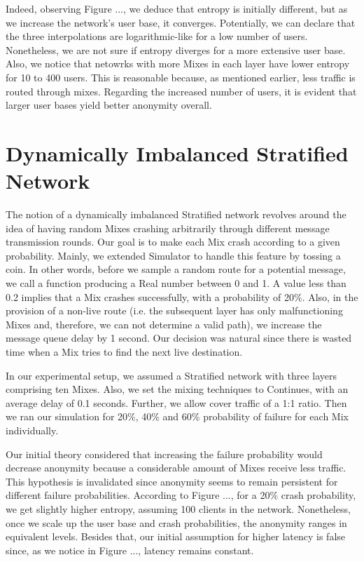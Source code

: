 \documentclass[logo,msc,cyber]{infthesis}   %
\begin{document}
Indeed, observing Figure ..., we deduce that entropy is initially different, but
as we increase the network's user base, it converges. Potentially, we can
declare that the three interpolations are logarithmic-like for a low number of
users. Nonetheless, we are not sure if entropy diverges for a more extensive
user base. Also, we notice that netowrks with more Mixes in each layer have
lower entropy for 10 to 400 users. This is reasonable because, as mentioned
earlier, less traffic is routed through mixes. Regarding the increased number of
users, it is evident that larger user bases yield better anonymity overall.


\section{Dynamically Imbalanced Stratified Network}
The notion of a dynamically imbalanced Stratified network revolves around the
idea of having random Mixes crashing arbitrarily through different message
transmission rounds. Our goal is to make each Mix crash according to a given
probability. Mainly, we extended Simulator to handle this feature by tossing a
coin. In other words, before we sample a random route for a potential message,
we call a function producing a Real number between 0 and 1. A value less than
0.2 implies that a Mix crashes successfully, with a probability of 20\%. Also,
in the provision of a non-live route (i.e. the subsequent layer has only
malfunctioning Mixes and, therefore, we can not determine a valid path), we
increase the message queue delay by 1 second. Our decision was natural since
there is wasted time when a Mix tries to find the next live destination.

In our experimental setup, we assumed a Stratified network with three layers
comprising ten Mixes. Also, we set the mixing techniques to Continues, with an
average delay of 0.1 seconds. Further, we allow cover traffic of a 1:1 ratio.
Then we ran our simulation for 20\%, 40\% and 60\% probability of failure for
each Mix individually. 

Our initial theory considered that increasing the failure probability would
decrease anonymity because a considerable amount of Mixes receive less traffic.
This hypothesis is invalidated since anonymity seems to remain persistent for
different failure probabilities. According to Figure ..., for a 20\% crash
probability, we get slightly higher entropy, assuming 100 clients in the
network. Nonetheless, once we scale up the user base and crash probabilities,
the anonymity ranges in equivalent levels. Besides that, our initial assumption
for higher latency is false since, as we notice in Figure ..., latency remains
constant. 
\end{document}
